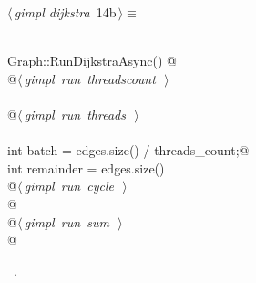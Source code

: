 \documentclass[12pt]{article}
\begin{document}
\begin{flushleft} \small
\begin{minipage}{\linewidth}\label{scrap26}\raggedright\small
{} $\langle\,${\itshape gimpl dijkstra}\nobreak\ {\footnotesize {14b}}$\,\rangle\equiv$
\vspace{-1ex}
\begin{list}{}{} \item
\mbox{}\verb@@\\
\mbox{}\verb@double Graph::RunDijkstraAsync() {@\\
\mbox{}\verb@    @\hbox{$\langle\,${\itshape gimpl run threadscount}\nobreak\ {\footnotesize {}}$\,\rangle$}\verb@@\\
\mbox{}\verb@@\\
\mbox{}\verb@    @\hbox{$\langle\,${\itshape gimpl run threads}\nobreak\ {\footnotesize {}}$\,\rangle$}\verb@@\\
\mbox{}\verb@@\\
\mbox{}\verb@    int batch = edges.size() / threads_count;@\\
\mbox{}\verb@    int remainder = edges.size() % threads_count;@\\
\mbox{}\verb@@\\
\mbox{}\verb@    @\hbox{$\langle\,${\itshape gimpl run cycle}\nobreak\ {\footnotesize {}}$\,\rangle$}\verb@@\\
\mbox{}\verb@    @\\
\mbox{}\verb@    @\hbox{$\langle\,${\itshape gimpl run sum}\nobreak\ {\footnotesize {}}$\,\rangle$}\verb@@\\
\mbox{}\verb@} @\\
\mbox{}\verb@@{\NWsep}
\end{list}
\vspace{-1.5ex}
\footnotesize
\begin{list}{}{\setlength{\itemsep}{-\parsep}\setlength{\itemindent}{-\leftmargin}}
\item \NWtxtMacroRefIn\ .

\item{}
\end{list}
\end{minipage}\vspace{4ex}
\end{flushleft}
\end{document}
